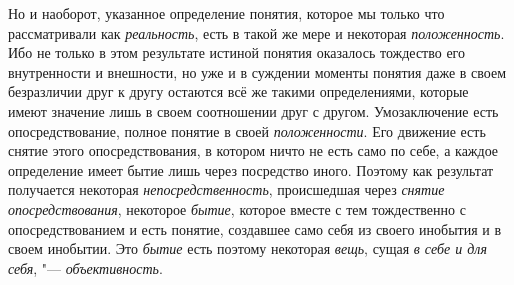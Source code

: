 {{Но и наоборот, указанное определение понятия, которое мы
только что рассматривали как {\em реальность}, есть в
такой же мере и некоторая {\em положенность}. Ибо
не только в этом результате истиной понятия оказалось тождество его
внутренности и внешности, но уже и в суждении моменты понятия даже в своем
безразличии друг к другу остаются всё же такими определениями, которые
имеют значение лишь в своем соотношении друг с другом. Умозаключение есть
опосредствование, полное понятие в своей {\em положенности}. Его
движение есть снятие этого опосредствования, в котором ничто не есть само
по себе, а каждое определение имеет бытие лишь через посредство иного.
Поэтому как результат получается некоторая {\em непосредственность},
происшедшая через {\em снятие опосредствования}, некоторое {\em бытие},
которое вместе с тем тождественно с опосредствованием и есть
понятие, создавшее само себя из своего инобытия и в своем инобытии. Это
{\em бытие} есть поэтому некоторая {\em вещь}, сущая {\em в себе и для
себя}, "--- {\em объективность}.

\bigskip

}}
